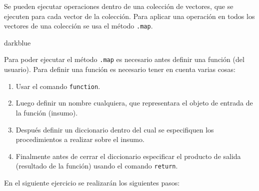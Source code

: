 \documentclass[
  12pt,
  letterpaper,
  twoside]{book}
\providecommand{\tightlist}{%
  \setlength{\itemsep}{0pt}\setlength{\parskip}{0pt}}
\begin{document}
Se pueden ejecutar operaciones dentro de una colección de vectores, que se ejecuten para cada vector de la colección. Para aplicar una operación en todos los vectores de una colección se usa el método \texttt{.map}.

\begin{bluebox2}

\begin{awesomeblock}{5pt}{\faLightbulb}{darkblue}

Para poder ejecutar el método \texttt{.map} es necesario antes definir una función (del usuario). Para definir una función es necesario tener en cuenta varias cosas:

\begin{enumerate}
\def\labelenumi{\arabic{enumi}.}
\tightlist
\item
  Usar el comando \texttt{function}.
\item
  Luego definir un nombre cualquiera, que representara el objeto de entrada de la función (insumo).
\item
  Después definir un diccionario dentro del cual se especifiquen los procedimientos a realizar sobre el insumo.
\item
  Finalmente antes de cerrar el diccionario especificar el producto de salida (resultado de la función) usando el comando \texttt{return}.
\end{enumerate}

\end{awesomeblock}

\end{bluebox2}

En el siguiente ejercicio se realizarán los siguientes pasos:
\end{document}

